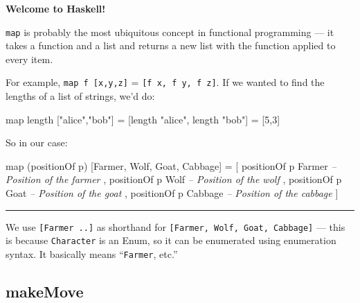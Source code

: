 \documentclass[]{article}
\newenvironment{Shaded}{}{}
\newcommand{\DataTypeTok}[1]{\textcolor[rgb]{0.56,0.13,0.00}{{#1}}}
\newcommand{\DecValTok}[1]{\textcolor[rgb]{0.25,0.63,0.44}{{#1}}}
\newcommand{\StringTok}[1]{\textcolor[rgb]{0.25,0.44,0.63}{{#1}}}
\newcommand{\CommentTok}[1]{\textcolor[rgb]{0.38,0.63,0.69}{\textit{{#1}}}}
\newcommand{\FunctionTok}[1]{\textcolor[rgb]{0.02,0.16,0.49}{{#1}}}
\newcommand{\NormalTok}[1]{{#1}}
\begin{document}
\textbf{Welcome to Haskell!}

\texttt{map} is probably the most ubiquitous concept in functional programming
--- it takes a function and a list and returns a new list with the function
applied to every item.

For example, \texttt{map\ f\ {[}x,y,z{]}} = \texttt{{[}f\ x,\ f\ y,\ f\ z{]}}.
If we wanted to find the lengths of a list of strings, we'd do:

\begin{Shaded}
\begin{Highlighting}[]
\NormalTok{map length [}\StringTok{"alice"}\NormalTok{,}\StringTok{"bob"}\NormalTok{]}
\FunctionTok{=} \NormalTok{[length }\StringTok{"alice"}\NormalTok{, length }\StringTok{"bob"}\NormalTok{]}
\FunctionTok{=} \NormalTok{[}\DecValTok{5}\NormalTok{,}\DecValTok{3}\NormalTok{]}
\end{Highlighting}
\end{Shaded}

So in our case:

\begin{Shaded}
\begin{Highlighting}[]
\NormalTok{map (positionOf p) [}\DataTypeTok{Farmer}\NormalTok{, }\DataTypeTok{Wolf}\NormalTok{, }\DataTypeTok{Goat}\NormalTok{, }\DataTypeTok{Cabbage}\NormalTok{]}
\FunctionTok{=} \NormalTok{[ positionOf p }\DataTypeTok{Farmer}         \CommentTok{-- Position of the farmer}
  \NormalTok{, positionOf p }\DataTypeTok{Wolf}           \CommentTok{-- Position of the wolf}
  \NormalTok{, positionOf p }\DataTypeTok{Goat}           \CommentTok{-- Position of the goat}
  \NormalTok{, positionOf p }\DataTypeTok{Cabbage}        \CommentTok{-- Position of the cabbage}
  \NormalTok{]}
\end{Highlighting}
\end{Shaded}

\begin{center}\rule{0.5\linewidth}{\linethickness}\end{center}

We use \texttt{{[}Farmer\ ..{]}} as shorthand for
\texttt{{[}Farmer,\ Wolf,\ Goat,\ Cabbage{]}} --- this is because
\texttt{Character} is an Enum, so it can be enumerated using enumeration syntax.
It basically means ``\texttt{Farmer}, etc.''

\subsection{makeMove}\label{makemove}
\end{document}
